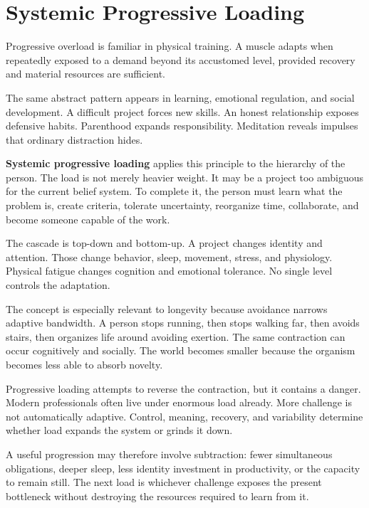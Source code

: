\chapter{Systemic Progressive Loading}\label{chapter-16-systemic-progressive-loading}

Progressive overload is familiar in physical training. A muscle adapts when repeatedly exposed to a demand beyond its accustomed level, provided recovery and material resources are sufficient.

The same abstract pattern appears in learning, emotional regulation, and social development. A difficult project forces new skills. An honest relationship exposes defensive habits. Parenthood expands responsibility. Meditation reveals impulses that ordinary distraction hides.

\textbf{Systemic progressive loading} applies this principle to the hierarchy of the person. The load is not merely heavier weight. It may be a project too ambiguous for the current belief system. To complete it, the person must learn what the problem is, create criteria, tolerate uncertainty, reorganize time, collaborate, and become someone capable of the work.

The cascade is top-down and bottom-up. A project changes identity and attention. Those change behavior, sleep, movement, stress, and physiology. Physical fatigue changes cognition and emotional tolerance. No single level controls the adaptation.

The concept is especially relevant to longevity because avoidance narrows adaptive bandwidth. A person stops running, then stops walking far, then avoids stairs, then organizes life around avoiding exertion. The same contraction can occur cognitively and socially. The world becomes smaller because the organism becomes less able to absorb novelty.

Progressive loading attempts to reverse the contraction, but it contains a danger. Modern professionals often live under enormous load already. More challenge is not automatically adaptive. Control, meaning, recovery, and variability determine whether load expands the system or grinds it down.

A useful progression may therefore involve subtraction: fewer simultaneous obligations, deeper sleep, less identity investment in productivity, or the capacity to remain still. The next load is whichever challenge exposes the present bottleneck without destroying the resources required to learn from it.
